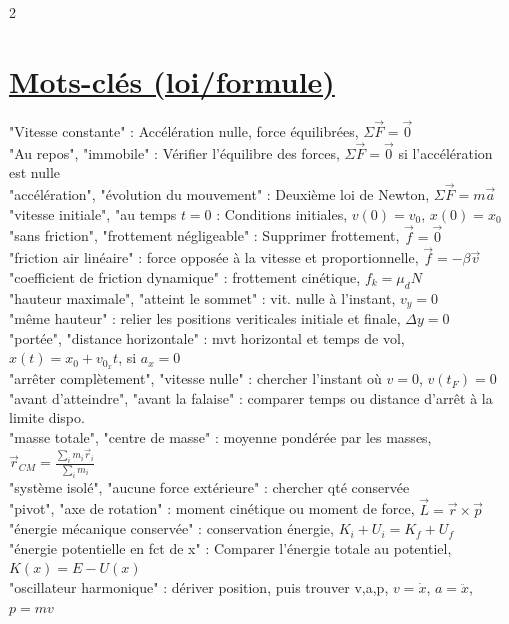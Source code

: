 \documentclass[11pt]{article}
\begin{document}
\begin{multicols}{2}
    \section{\underline{Mots-clés (loi/formule)}}
    "Vitesse constante" : Accélération nulle, force équilibrées, $\Sigma \vec{F}=\vec{0}$\\
    "Au repos", "immobile" : Vérifier l'équilibre des forces, $\Sigma \vec{F}=\vec{0}$ si l'accélération est nulle\\
    "accélération", "évolution du mouvement" : Deuxième loi de Newton, $\Sigma \vec{F}=m\vec{a}$ \\
    "vitesse initiale", "au temps $t=0$ : Conditions initiales, $v(0)=v_0$, $x(0)=x_0$ \\
    "sans friction", "frottement négligeable" : Supprimer frottement, $\vec{f}=\vec{0}$\\
    "friction air linéaire" : force opposée à la vitesse et proportionnelle, $\vec{f}=-\beta\vec{v}$\\
    "coefficient de friction dynamique" : frottement cinétique, $f_k=\mu_dN$\\
    "hauteur maximale", "atteint le sommet" : vit. nulle à l'instant, $v_y=0$\\
    "même hauteur" : relier les positions veriticales initiale et finale, $\Delta y=0$\\
    "portée", "distance horizontale" : mvt horizontal et temps de vol, $x(t)=x_0+v_{0_x}t$, si $a_x=0$\\
    "arrêter complètement", "vitesse nulle" : chercher l'instant où $v=0$, $v(t_F)=0$\\
    "avant d'atteindre", "avant la falaise" : comparer temps ou distance d'arrêt à la limite dispo.\\
    "masse totale", "centre de masse" : moyenne pondérée par les masses, $\vec{r}_{CM}=\frac{\sum_i m_i\vec{r}_i}{\sum_i m_i}$\\
    "système isolé", "aucune force extérieure" : chercher qté conservée \\
    "pivot", "axe de rotation" : moment cinétique ou moment de force, $\vec{L}=\vec{r}\times\vec{p}$\\
    "énergie mécanique conservée" : conservation énergie, $K_i+U_i=K_f+U_f$\\
    "énergie potentielle en fct de x" : Comparer l'énergie totale au potentiel, $K(x)=E-U(x)$\\
    "oscillateur harmonique" : dériver position, puis trouver v,a,p, $v=\dot{x}$, $a=\ddot{x}$, $p=mv$


\end{multicols}
\end{document}
